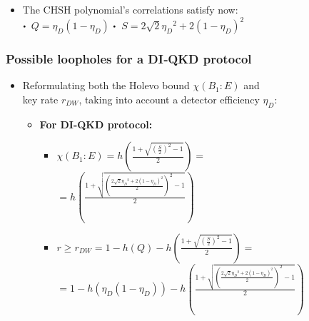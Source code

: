 \documentclass{beamer}
\newcommand\sbullet[1][.5]{\mathbin{\vcenter{\hbox{\scalebox{#1}{$\bullet$}}}}}
\begin{document}
\begin{frame}
\begin{itemize}
\begin{itemize}
                    \begin{itemize}
                        \small
                        \item The CHSH polynomial's correlations satisfy now:\\
                        \footnotesize
                        $\sbullet$\, $Q = {\eta}_{D} (1 - {\eta}_{D})$
                        \hspace{2.5ex}
                        $\sbullet$\, $S = 2 \sqrt{2} {{\eta}_{D}}^{2} + 2 {(1 - {\eta}_{D})}^{2}$
                    \end{itemize}
                \end{itemize}
            \end{itemize}
		\end{frame}

		\begin{frame}
			\frametitle{\Large Possible loopholes for a DI‑QKD protocol}

            \vspace{3.5ex}
            \begin{itemize}
                \item Reformulating both the Holevo bound $\chi({B}_{1}:E)$ and\\ key rate ${r}_{DW}$, taking into account a detector efficiency ${\eta}_{D}$:
                \begin{itemize}
                    \item \textbf{For DI-QKD protocol:}
                    \begin{itemize}
                        \item $\chi({B}_{1}:E) = h\left( \frac{1 + \sqrt{{(\frac{S}{2})}^{2} - 1}}{2} \right) = $\\
                        \vspace{0.5ex}
                        \hspace{8ex}
                        $ = h\left( \frac{1 + \sqrt{{\left(\frac{ 2 \sqrt{2} {{\eta}_{D}}^{2} + 2 {(1 - {\eta}_{D})}^{2} }{2}\right)}^{2} - 1}}{2} \right)$
                        \item $r \geq {r}_{DW} = 1 - h(Q) - h\left( \frac{1 + \sqrt{{(\frac{S}{2})}^{2} - 1}}{2} \right) = $\\
                        \vspace{0.25ex}
                        \hspace{6.8ex}$= 1 - h({\eta}_{D} (1 - {\eta}_{D})) - h\left( \frac{1 + \sqrt{{\left(\frac{ 2 \sqrt{2} {{\eta}_{D}}^{2} + 2 {(1 - {\eta}_{D})}^{2} }{2}\right)}^{2} - 1}}{2} \right)$\\
                    \end{itemize}
                \end{itemize}
            \end{itemize}
		\end{frame}
\end{document}
